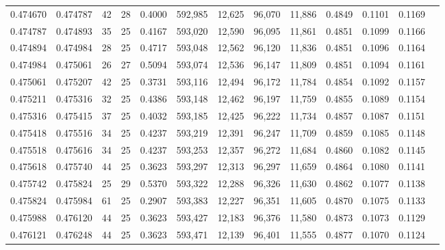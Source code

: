 \begin{tabular}{rrrrrrrrrrrrr}
0.474670 & 0.474787 &    42 &  28 &                                     0.4000 & 592,985 &  12,625 &  96,070 &  11,886 & 0.4849 & 0.1101 & 0.1169 \\
0.474787 & 0.474893 &    35 &  25 &                                     0.4167 & 593,020 &  12,590 &  96,095 &  11,861 & 0.4851 & 0.1099 & 0.1166 \\
0.474894 & 0.474984 &    28 &  25 &                                     0.4717 & 593,048 &  12,562 &  96,120 &  11,836 & 0.4851 & 0.1096 & 0.1164 \\
0.474984 & 0.475061 &    26 &  27 &                                     0.5094 & 593,074 &  12,536 &  96,147 &  11,809 & 0.4851 & 0.1094 & 0.1161 \\
0.475061 & 0.475207 &    42 &  25 &                                     0.3731 & 593,116 &  12,494 &  96,172 &  11,784 & 0.4854 & 0.1092 & 0.1157 \\
0.475211 & 0.475316 &    32 &  25 &                                     0.4386 & 593,148 &  12,462 &  96,197 &  11,759 & 0.4855 & 0.1089 & 0.1154 \\
0.475316 & 0.475415 &    37 &  25 &                                     0.4032 & 593,185 &  12,425 &  96,222 &  11,734 & 0.4857 & 0.1087 & 0.1151 \\
0.475418 & 0.475516 &    34 &  25 &                                     0.4237 & 593,219 &  12,391 &  96,247 &  11,709 & 0.4859 & 0.1085 & 0.1148 \\
0.475518 & 0.475616 &    34 &  25 &                                     0.4237 & 593,253 &  12,357 &  96,272 &  11,684 & 0.4860 & 0.1082 & 0.1145 \\
0.475618 & 0.475740 &    44 &  25 &                                     0.3623 & 593,297 &  12,313 &  96,297 &  11,659 & 0.4864 & 0.1080 & 0.1141 \\
0.475742 & 0.475824 &    25 &  29 &                                     0.5370 & 593,322 &  12,288 &  96,326 &  11,630 & 0.4862 & 0.1077 & 0.1138 \\
0.475824 & 0.475984 &    61 &  25 &                                     0.2907 & 593,383 &  12,227 &  96,351 &  11,605 & 0.4870 & 0.1075 & 0.1133 \\
0.475988 & 0.476120 &    44 &  25 &                                     0.3623 & 593,427 &  12,183 &  96,376 &  11,580 & 0.4873 & 0.1073 & 0.1129 \\
0.476121 & 0.476248 &    44 &  25 &                                     0.3623 & 593,471 &  12,139 &  96,401 &  11,555 & 0.4877 & 0.1070 & 0.1124 \\

\end{tabular}
